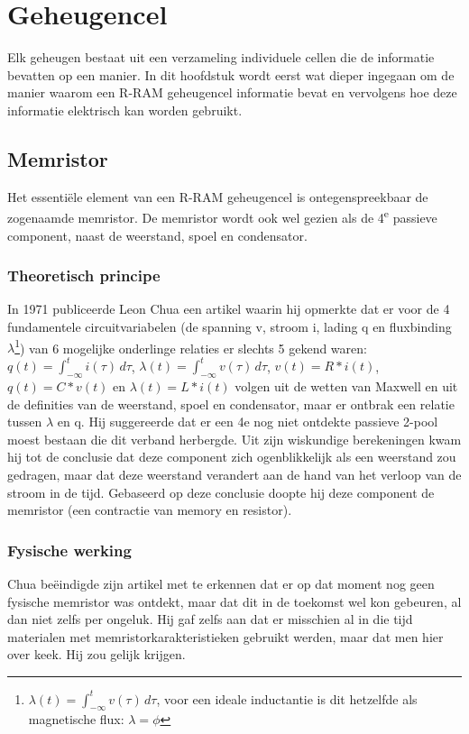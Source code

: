 \chapter{Geheugencel}
\label{cell}
Elk geheugen bestaat uit een verzameling individuele cellen die de informatie bevatten op een manier.
In dit hoofdstuk wordt eerst wat dieper ingegaan om de manier waarom een R-RAM geheugencel informatie bevat en vervolgens hoe deze informatie elektrisch kan worden gebruikt.

\section{Memristor}
Het essentiële element van een R-RAM geheugencel is ontegenspreekbaar de zogenaamde memristor.
De memristor wordt ook wel gezien als de 4\textsuperscript{e} passieve component, naast de weerstand, spoel en condensator.

\subsection{Theoretisch principe}
In 1971 publiceerde Leon Chua een artikel waarin hij opmerkte dat er voor de 4 fundamentele circuitvariabelen (de spanning v, stroom i, lading q en fluxbinding $\lambda$\footnote{$\lambda(t) =  \int^{t}_{-\infty} v(\tau) \, d\tau $, voor een ideale inductantie is dit hetzelfde als magnetische flux: $\lambda = \phi$ }) van 6 mogelijke onderlinge relaties er slechts 5 gekend waren: $q(t) =  \int^{t}_{-\infty} i(\tau) \, d\tau $, $\lambda(t) =  \int^{t}_{-\infty} v(\tau) \, d\tau $, $v(t)=R*i(t)$, $q(t)=C*v(t)$ en $\lambda(t) = L*i(t)$ volgen uit de wetten van Maxwell en uit de definities van de weerstand, spoel en condensator, maar er ontbrak een relatie tussen $\lambda$ en q.\cite{Chu71} Hij suggereerde dat er een 4e nog niet ontdekte passieve 2-pool moest bestaan die dit verband herbergde.
Uit zijn wiskundige berekeningen kwam hij tot de conclusie dat deze component zich ogenblikkelijk als een weerstand zou gedragen, maar dat deze weerstand verandert aan de hand van het verloop van de stroom in de tijd. Gebaseerd op deze conclusie doopte hij deze component de memristor (een contractie van memory en resistor).

\subsection{Fysische werking}
Chua beëindigde zijn artikel met te erkennen dat er op dat moment nog geen fysische memristor was ontdekt, maar dat dit in de toekomst wel kon gebeuren, al dan niet zelfs per ongeluk. Hij gaf zelfs aan dat er misschien al in die tijd materialen met memristorkarakteristieken gebruikt werden, maar dat men hier over keek. Hij zou gelijk krijgen.


